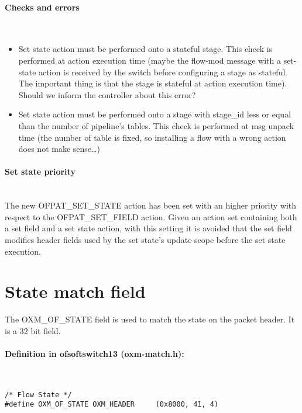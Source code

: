 \paragraph{Checks and errors}\mbox{}\\
\begin{itemize}
\setlength\itemsep{0em}
\item Set state action must be performed onto a stateful stage. This check is performed at action execution time (maybe the flow-mod message with a set-state action is received by the switch before configuring a stage as stateful. The important thing is that the stage is stateful at action execution time). Should we inform the controller about this error?
\item Set state action must be performed onto a stage with stage\_id less or equal than the number of pipeline’s tables. This check is performed at msg unpack time (the number of table is fixed, so installing a flow with a wrong action does not make sense…) 
\end{itemize}
\paragraph{Set state priority}\mbox{}\\

The new OFPAT\_SET\_STATE action has been set with an higher priority with respect to the OFPAT\_SET\_FIELD action.
Given an action set containing both a set field and a set state action, with this setting it is avoided that the set field modifies header fields used by the set state's update scope before the set state execution.

\section{State match field}
\label{sec:match_state}
The OXM\_OF\_STATE field is used to match the state on the packet header. It is a 32 bit field.

\paragraph{Definition in ofsoftswitch13 (oxm-match.h):}\mbox{}\\
\begin{lstlisting}[style=customc]
/* Flow State */
#define OXM_OF_STATE OXM_HEADER     (0x8000, 41, 4)
\end{lstlisting}

